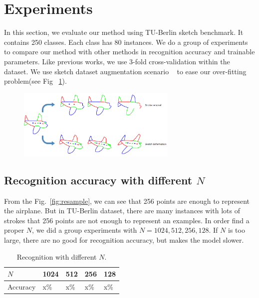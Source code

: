 \section{Experiments}
\label{sec:experiments}
In this section, we evaluate our method using  TU-Berlin sketch benchmark. It contains 250 classes. Each class has 80 instances. We do a group of experiments to compare our method with other methods in recognition accuracy and trainable parameters. Like previous works, we use 3-fold cross-validation within the dataset.  We use sketch dataset augmentation scenario  ~\cite{Yu2015SketchaNetTB} to ease our over-fitting problem(see Fig ~\ref{fig:aug_data}).

\begin{figure}[htbp]
    \center
    \includegraphics[width=3in]{images/aug_data.png}
    \label{fig:aug_data}
\end{figure}

\subsection{Recognition accuracy with different $N$}
\label{ssec:resample_number}

From the Fig.~\ref{fig:resample}, we can see that 256 points are enough to represent the airplane. But in TU-Berlin dataset, there are many instances with lots of strokes that 256 points are not enough to represent an examples. In order find a proper $N$, we did a group experiments with $N = 1024, 512, 256, 128$. If $N$ is too large, there are no good for recognition accuracy, but makes the model slower.

\begin{table}[htbp]
\begin{tabular}{|p{1.4cm}|p{1.3cm}|p{1.3cm}|p{1.3cm}|p{1.3cm}|}
    \hline
     $N$ & 1024& 512 & 256 & 128\\
    \hline
     Accuracy & x\% & x\% & x\%& x\%\\
    \hline
\end{tabular}
\caption{Recognition with different $N$.}
\end{table}

